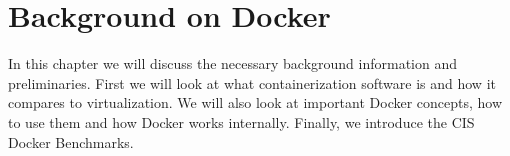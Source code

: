\chapter{Background on Docker}\label{chapter:background}
In this chapter we will discuss the necessary background information and preliminaries. First we will look at what containerization software is and how it compares to virtualization. We will also look at important Docker concepts, how to use them and how Docker works internally. Finally, we introduce the CIS Docker Benchmarks.



